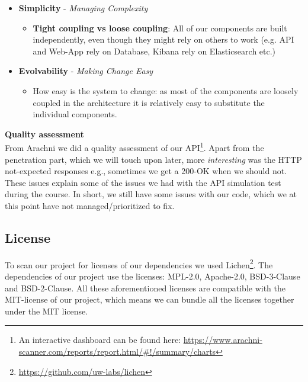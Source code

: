 \begin{itemize}
\begin{itemize}
    \end{itemize}
    \item \textbf{Simplicity} - \textit{Managing Complexity}
    \begin{itemize}
        \item \textbf{Tight coupling vs loose coupling}: All of our components are built independently, even though they might rely on others to work (e.g. API and Web-App rely on Database, Kibana rely on Elasticsearch etc.)
    \end{itemize}
    \item \textbf{Evolvability} - \textit{Making Change Easy} 
    \begin{itemize}
        \item How easy is the system to change: as most of the components are loosely coupled in the architecture it is relatively easy to substitute the individual components.  
    \end{itemize}
    
\end{itemize}

\textbf{Quality assessment}\\
From Arachni we did a quality assessment of our API\footnote{An interactive dashboard can be found here: \url{https://www.arachni-scanner.com/reports/report.html/\#!/summary/charts}}. Apart from the penetration part, which we will touch upon later, more \textit{interesting} was the HTTP not-expected responses e.g., sometimes we get a 200-OK when we should not. These issues explain some of the issues we had with the API simulation test during the course.
In short, we still have some issues with our code, which we at this point have not managed/prioritized to fix.



\subsection{License}
To scan our project for licenses of our dependencies we used Lichen\footnote{\url{https://github.com/uw-labs/lichen}}. The dependencies of our project use the licenses: MPL-2.0, Apache-2.0, BSD-3-Clause and BSD-2-Clause. All these aforementioned licenses are compatible with the MIT-license of our project, which means we can bundle all the licenses together under the MIT license. 